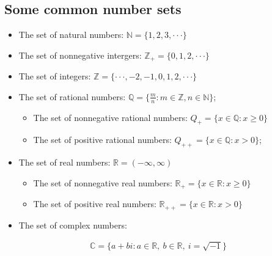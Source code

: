 \documentclass[letterpaper,10pt,english]{jupyterBook}
\begin{document}
\subsection{Some common number sets}
\label{\detokenize{02.sets_numbers_coordinates_distances:some-common-number-sets}}\begin{itemize}
\item {} 
\sphinxAtStartPar
The set of natural numbers: \(\mathbb{N} = \{1, 2, 3, · · · \}\)

\item {} 
\sphinxAtStartPar
The set of non\sphinxhyphen{}negative intergers: \(\mathbb{Z}_+ = \{0, 1, 2, · · · \}\)

\item {} 
\sphinxAtStartPar
The set of integers: \(\mathbb{Z} = \{· · · , −2, −1, 0, 1, 2, · · · \}\)

\item {} 
\sphinxAtStartPar
The set of rational numbers: \(\mathbb{Q} = \{ \frac{m}{n} : m \in \mathbb{Z}, n \in \mathbb{N}\}\);
\begin{itemize}
\item {} 
\sphinxAtStartPar
The set of non\sphinxhyphen{}negative rational numbers: \(Q_+ = \{x \in \mathbb{Q} : x \geqslant 0\}\)

\item {} 
\sphinxAtStartPar
The set of positive rational numbers: \(Q_{++} = \{x \in \mathbb{Q} : x > 0\}\);

\end{itemize}

\item {} 
\sphinxAtStartPar
The set of real numbers: \(\mathbb{R} = (−∞, ∞)\)
\begin{itemize}
\item {} 
\sphinxAtStartPar
The set of non\sphinxhyphen{}negative real numbers: \(\mathbb{R}_+ = \{x \in \mathbb{R} : x \geqslant 0\}\)

\item {} 
\sphinxAtStartPar
The set of positive real numbers: \(\mathbb{R}_{++} = \{x \in \mathbb{R}: x > 0\}\)

\end{itemize}

\item {} 
\sphinxAtStartPar
The set of complex numbers:

\end{itemize}
\begin{equation*}
\begin{split}\mathbb{C} = \{ a + bi : a \in \mathbb{R}, \: b \in \mathbb{R}, \: i = \sqrt{−1} \}\end{split}
\end{equation*}
\end{document}
